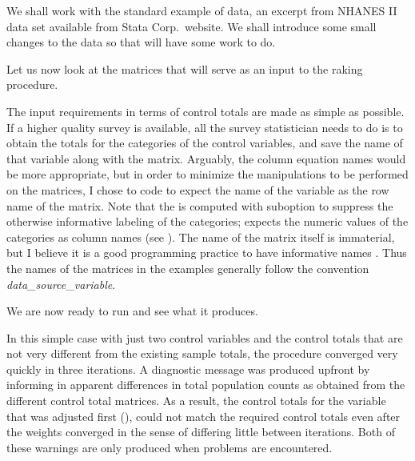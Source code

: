 \begin{stexample}[Example 1]

We shall work with the standard example of  data,
an excerpt from NHANES II data set available from Stata Corp.\ website.
We shall introduce some small changes to the data so that
 will have some work to do.

\begin{stlog}
\nullskip
\end{stlog}

Let us now look at the matrices that will serve as an input to the
raking procedure.

\begin{stlog}
\nullskip
\end{stlog}

The input requirements in terms of control totals are made as simple as possible.
If a higher quality survey is available, all the survey statistician needs to do
is to obtain the totals for the categories of the control variables,
and save the name of that variable along with the matrix.
Arguably, the column equation names would be more appropriate,
but in order to minimize the manipulations to be performed on the
matrices, I chose to code  to expect the name
of the variable as the row name of the matrix. Note that the 
is computed with  suboption to suppress
the otherwise informative labeling of the categories;
 expects the numeric values of the categories
as column names (see ).
The name of the matrix itself is immaterial, but I believe it is
a good programming practice
to have informative names \citep{mcconnell:2004}. Thus the names
of the matrices in the examples generally follow the convention
{\it data{\_}source}{\_}{\it variable}.

We are now ready to run  and see what it produces.

\begin{stlog}
\nullskip
\end{stlog}

In this simple case with just two control variables
and the control totals that are not very different from the
existing sample totals, the procedure converged very quickly
in three iterations. A diagnostic message was produced upfront
by  informing in apparent differences in
total population counts as obtained from the different
control total matrices. As a result, the control totals
for the variable that was adjusted first (),
could not match the required control totals even after the
weights converged in the sense of differing little between
iterations. Both of these warnings are only produced when
problems are encountered.


\end{stexample}

